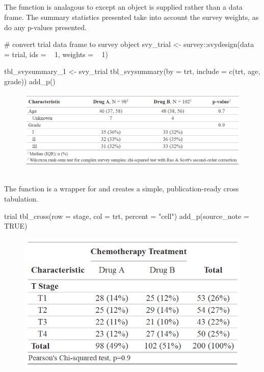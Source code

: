 \subsection{\texorpdfstring{}{tbl\_svysummary()}}

The  function is analagous to  except an  \citep{survey} object is supplied rather than a data frame.
The summary statistics presented take into account the survey weights, as do any p-values presented.

\begin{example}
# convert trial data frame to survey object
svy_trial <- survey::svydesign(data = trial, ids = ~ 1, weights = ~ 1)

tbl_svysummary_1 <-
  svy_trial %
  tbl_svysummary(by = trt, include = c(trt, age, grade)) %
  add_p()
\end{example}
\begin{figure}[h!]
  \includegraphics[scale=0.49]{svysummary.png}
  \centering
\end{figure}

\subsection{\texorpdfstring{}{tbl\_cross()}}

The  function is a wrapper for  and creates a simple, publication-ready cross tabulation.

\newpage
\begin{example}
trial %
  tbl_cross(row = stage, col = trt, percent = "cell") %
  add_p(source_note = TRUE)
\end{example}
\begin{figure}[h!]
  \includegraphics[scale=0.49]{cross.png}
  \centering
\end{figure}

